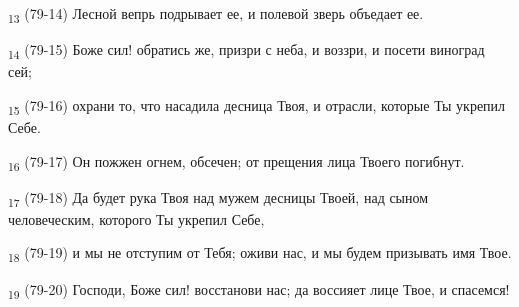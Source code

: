 \begin{tcolorbox}
\textsubscript{13} (79-14) Лесной вепрь подрывает ее, и полевой зверь объедает ее.
\end{tcolorbox}
\begin{tcolorbox}
\textsubscript{14} (79-15) Боже сил! обратись же, призри с неба, и воззри, и посети виноград сей;
\end{tcolorbox}
\begin{tcolorbox}
\textsubscript{15} (79-16) охрани то, что насадила десница Твоя, и отрасли, которые Ты укрепил Себе.
\end{tcolorbox}
\begin{tcolorbox}
\textsubscript{16} (79-17) Он пожжен огнем, обсечен; от прещения лица Твоего погибнут.
\end{tcolorbox}
\begin{tcolorbox}
\textsubscript{17} (79-18) Да будет рука Твоя над мужем десницы Твоей, над сыном человеческим, которого Ты укрепил Себе,
\end{tcolorbox}
\begin{tcolorbox}
\textsubscript{18} (79-19) и мы не отступим от Тебя; оживи нас, и мы будем призывать имя Твое.
\end{tcolorbox}
\begin{tcolorbox}
\textsubscript{19} (79-20) Господи, Боже сил! восстанови нас; да воссияет лице Твое, и спасемся!
\end{tcolorbox}
